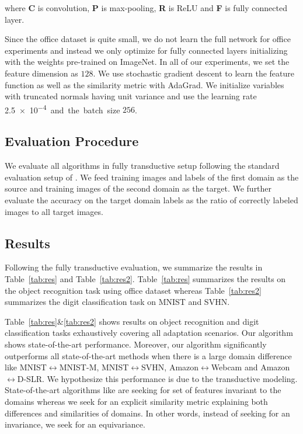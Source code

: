 where \textbf{C} is convolution, \textbf{P} is max-pooling, \textbf{R} is ReLU and \textbf{F} is fully connected layer. 

Since the office dataset is quite small, we do not learn the full network for office experiments and instead we only optimize for fully connected layers initializing with the weights pre-trained on ImageNet. In all of our experiments, we set the feature dimension as $128$. We use stochastic gradient descent to learn the feature function as well as the similarity metric with AdaGrad\cite{adagrad}. We initialize variables with truncated normals having unit variance and use the learning rate \SI{2.5e-4}  and the batch size $256$. 

\subsection{Evaluation Procedure}
We evaluate all algorithms in fully transductive setup following the standard evaluation setup of \cite{office}.  We feed training images and labels of the first domain as the source and training images of the second domain as the target. We further evaluate the accuracy on the target domain labels as the ratio of correctly labeled images to all target images.

\subsection{Results}
Following the fully transductive evaluation, we summarize the results in Table~\ref{tab:res} and Table~\ref{tab:res2}. Table~\ref{tab:res} summarizes the results on the object recognition task using office dataset whereas  Table~\ref{tab:res2} summarizes the digit classification task on MNIST and SVHN.

Table~\ref{tab:res}\&\ref{tab:res2} shows results on object recognition and digit classification tasks exhaustively covering all adaptation scenarios. Our algorithm shows state-of-the-art performance. Moreover, our algorithm significantly outperforms all state-of-the-art methods when there is a large domain difference like MNIST$\leftrightarrow$MNIST-M, MNIST$\leftrightarrow$SVHN, Amazon$\leftrightarrow$Webcam and Amazon$\leftrightarrow$D-SLR. We hypothesize this performance is due to the transductive modeling. State-of-the-art algorithms like \cite{ganin15} are seeking for set of features invariant to the domains whereas we seek for an explicit similarity metric explaining both differences and similarities of domains. In other words, instead of seeking for an invariance, we seek for an equivariance.


